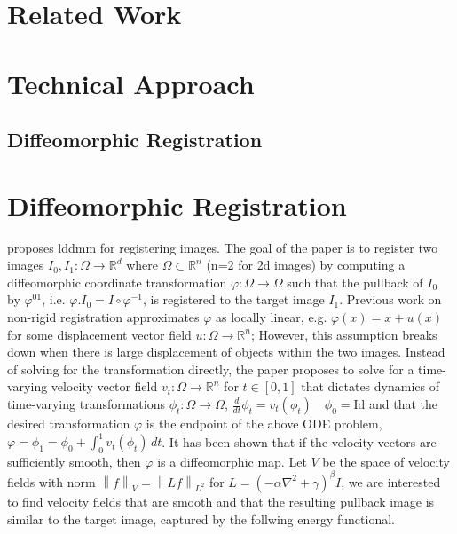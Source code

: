 \documentclass{6838publ}
\newcommand{\norm}[1]{\left\lVert#1\right\rVert}
\newcommand\R{\ensuremath{\mathbb{R}}} %
\begin{document}
\section{Related Work}



\section{Technical Approach}\label{sec:technical_approach}


\subsection{Diffeomorphic Registration}


\section{Diffeomorphic Registration}




\cite{begComputingLargeDeformation2005} 


proposes lddmm for registering images. The goal of the paper is to register two images $I_0,I_1: \Omega\to\R^d$ where $\Omega\subset\R^n$ (n=2 for 2d images) by computing a diffeomorphic coordinate transformation $\varphi:\Omega\to\Omega$ such that the pullback of $I_0$ by $\varphi^{01}$, i.e. $\varphi.I_0 = I\circ \varphi^{-1}$, is registered to the target image $I_1$. Previous work on non-rigid registration approximates $\varphi$ as locally linear, e.g. $\varphi(x) = x + u(x)$ for some displacement vector field $u:\Omega\to\R^n$; However, this assumption breaks down when there is large displacement of objects within the two images. Instead of solving for the transformation directly, the paper proposes to solve for a time-varying velocity vector field $v_t: \Omega\to\R^n$ for $t\in [0,1]$ that dictates dynamics of time-varying transformations $\phi_t: \Omega\to\Omega$, $\frac{d}{dt} \phi_t = v_t(\phi_t) \quad \phi_0 = \text{Id}$ and that the desired transformation $\varphi$ is the endpoint of the above ODE problem, $\varphi  = \phi_1 = \phi_0 + \int_0^1 v_t(\phi_t) \, dt$.
It has been shown that if the velocity vectors are sufficiently smooth, then $\varphi$ is a diffeomorphic map. Let $V$ be the space of velocity fields with norm $\norm{f}_V = \norm{Lf}_{L^2}$ for $L = (-\alpha \nabla^2 + \gamma)^{\beta} I$, we are interested to find velocity fields that are smooth and that the resulting pullback image is similar to the target image, captured by the follwing energy functional.
\end{document}

